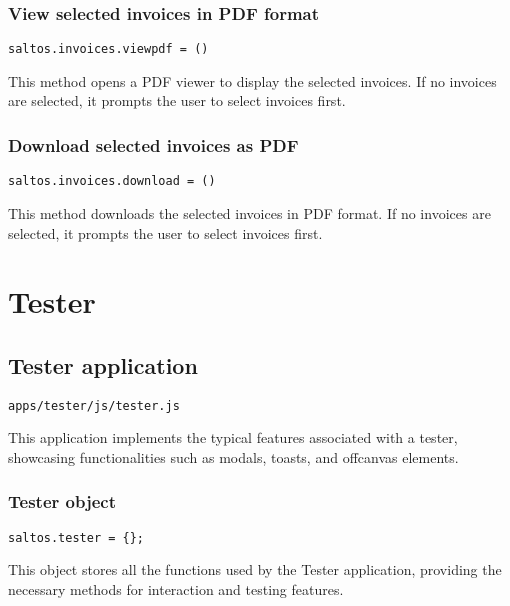 \documentclass[a4paper]{article}
\begin{document}
\hypertarget{toc146}{}
\subsubsection{View selected invoices in PDF format}

\begin{lstlisting}
saltos.invoices.viewpdf = ()
\end{lstlisting}

This method opens a PDF viewer to display the selected invoices.
If no invoices are selected, it prompts the user to select invoices first.

\hypertarget{toc147}{}
\subsubsection{Download selected invoices as PDF}

\begin{lstlisting}
saltos.invoices.download = ()
\end{lstlisting}

This method downloads the selected invoices in PDF format.
If no invoices are selected, it prompts the user to select invoices first.


\hypertarget{toc148}{}
\section{Tester}

\hypertarget{toc149}{}
\subsection{Tester application}

\begin{lstlisting}
apps/tester/js/tester.js
\end{lstlisting}

This application implements the typical features associated with a tester,
showcasing functionalities such as modals, toasts, and offcanvas elements.

\hypertarget{toc150}{}
\subsubsection{Tester object}

\begin{lstlisting}
saltos.tester = {};
\end{lstlisting}

This object stores all the functions used by the Tester application,
providing the necessary methods for interaction and testing features.
\end{document}
